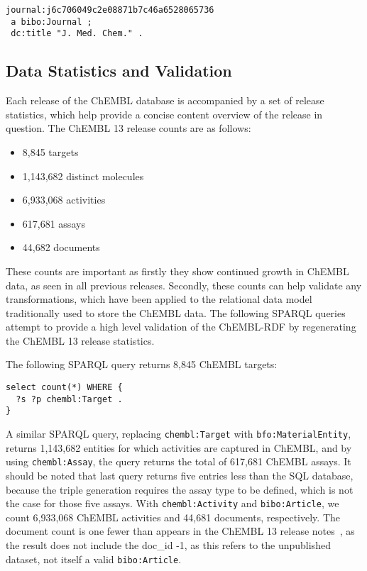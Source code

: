\documentclass[10pt]{bmc_article}
\newenvironment{bmcformat}{\begin{raggedright}\baselineskip20pt\sloppy\setboolean{publ}{false}}{\end{raggedright}\baselineskip20pt\sloppy}
\begin{document}
\begin{bmcformat}
\begin{small}
\begin{verbatim}
journal:j6c706049c2e08871b7c46a6528065736
 a bibo:Journal ;
 dc:title "J. Med. Chem." .
\end{verbatim}
\end{small}

\subsection*{Data Statistics and Validation}

Each release of the ChEMBL database is accompanied by a set of release statistics, which help 
provide a concise content overview of the release in question. The ChEMBL 13 release counts
are as follows:
\begin{itemize}
  \item 8,845 targets
  \item 1,143,682 distinct molecules
  \item 6,933,068 activities
  \item 617,681 assays
  \item 44,682 documents
\end{itemize}

These counts are important as firstly they show continued growth in ChEMBL data, as seen 
in all previous releases. Secondly, these counts can help validate any transformations, 
which have been applied to the relational data model traditionally used to store the ChEMBL 
data.  The following SPARQL queries attempt to provide a high level validation of the 
ChEMBL-RDF by regenerating the ChEMBL 13 release statistics.

The following SPARQL query returns 8,845 ChEMBL targets:
     
\begin{small}
\begin{verbatim}
select count(*) WHERE {
  ?s ?p chembl:Target .
}
\end{verbatim}
\end{small}

A similar SPARQL query, replacing \verb+chembl:Target+ with \verb+bfo:MaterialEntity+, returns 1,143,682 entities for which activities are captured in ChEMBL, and by using \verb+chembl:Assay+, the query returns the total of 617,681 ChEMBL assays.
It should be noted that last query returns five entries less than the SQL database, because the
triple generation requires the assay type to be defined, which is not the case for those 
five assays. With \verb+chembl:Activity+ and \verb+bibo:Article+, we count 6,933,068 ChEMBL activities and 44,681 documents,
respectively. The document count is one fewer than appears 
in the ChEMBL 13 release notes~\cite{ChEMBL13ReleaseNotes}, as the result does not include the doc\_id -1, as this refers to the 
unpublished dataset, not itself a valid \verb+bibo:Article+.


\end{bmcformat}
\end{document}
